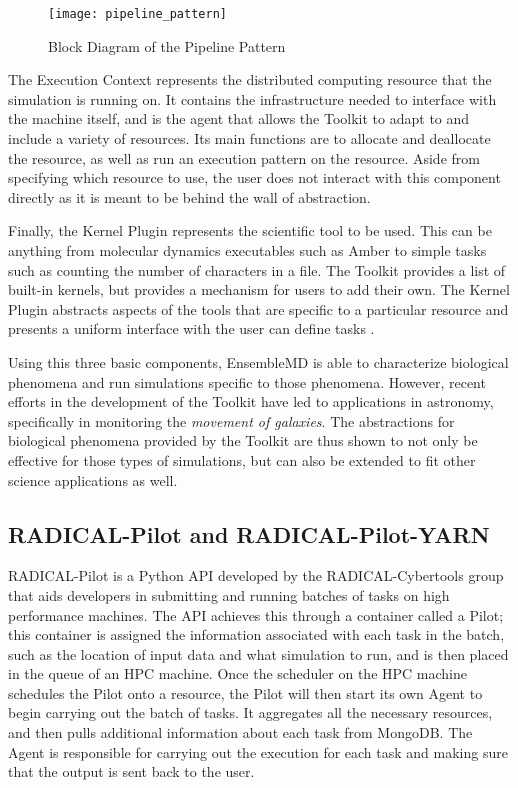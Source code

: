 \documentclass[]{article}
\begin{document}
		\begin{figure}[H]
			\centering
			\texttt{[image: pipeline\_pattern]}
			\caption{Block Diagram of the Pipeline Pattern \cite{pipeline_pattern}}
			\label{fig:pipeline_block_diagram}
		\end{figure}

		The Execution Context represents the distributed computing resource that the simulation is running on. It contains the infrastructure needed to interface with the machine itself, and is the agent that allows the Toolkit to adapt to and include a variety of resources. Its main functions are to allocate and deallocate the resource, as well as run an execution pattern on the resource. Aside from specifying which resource to use, the user does not interact with this component directly as it is meant to be behind the wall of abstraction. 

		Finally, the Kernel Plugin represents the scientific tool to be used. This can be anything from molecular dynamics executables such as Amber to simple tasks such as counting the number of characters in a file. The Toolkit provides a list of built-in kernels, but provides a mechanism for users to add their own. The Kernel Plugin abstracts aspects of the tools that are specific to a particular resource and presents a uniform interface with the user can define tasks \cite{enmd_paper}.

		Using this three basic components, EnsembleMD is able to characterize biological phenomena and run simulations specific to those phenomena. However, recent efforts in the development of the Toolkit have led to applications in astronomy, specifically in monitoring the \textit{movement of galaxies}. The abstractions for biological phenomena provided by the Toolkit are thus shown to not only be effective for those types of simulations, but can also be extended to fit other science applications as well.

	\subsection{RADICAL-Pilot and RADICAL-Pilot-YARN}
		
		RADICAL-Pilot is a Python API developed by the RADICAL-Cybertools group that aids developers in submitting and running batches of tasks on high performance machines. The API achieves this through a container called a Pilot; this container is assigned the information associated with each task in the batch, such as the location of input data and what simulation to run, and is then placed in the queue of an HPC machine. Once the scheduler on the HPC machine schedules the Pilot onto a resource, the Pilot will then start its own Agent to begin carrying out the batch of tasks. It aggregates all the necessary resources, and then pulls additional information about each task from MongoDB. The Agent is responsible for carrying out the execution for each task and making sure that the output is sent back to the user.
\end{document}
